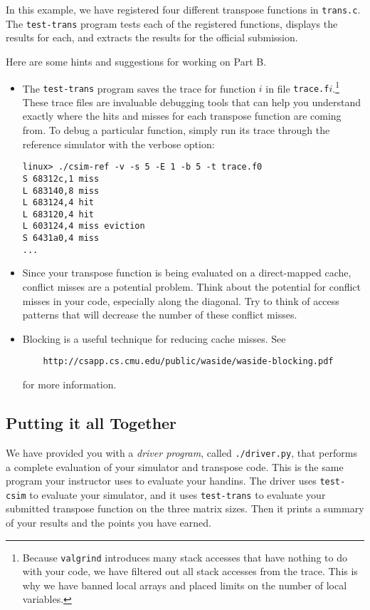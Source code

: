 \documentclass[11pt]{article}
\begin{document}
In this example, we have registered four different transpose
functions in {\tt trans.c}. The \verb:test-trans: program tests each
of the registered functions, displays the results for each, and
extracts the results for the official submission.

Here are some hints and suggestions for working on Part B.
\begin{itemize}
\item The {\tt test-trans} program saves the trace for function $i$ in
  file {\tt trace.f}$i$.\footnote{Because {\tt valgrind} introduces
    many stack accesses that have nothing to do with your code, we
    have filtered out all stack accesses from the trace. This is why
    we have banned local arrays and placed limits on the number of
    local variables.} These trace files are invaluable debugging tools
  that can help you understand exactly where the hits and misses for
  each transpose function are coming from. To debug a particular
  function, simply run its trace through the reference simulator with
  the verbose option:
\begin{verbatim}
linux> ./csim-ref -v -s 5 -E 1 -b 5 -t trace.f0
S 68312c,1 miss
L 683140,8 miss
L 683124,4 hit
L 683120,4 hit
L 603124,4 miss eviction
S 6431a0,4 miss
...
\end{verbatim}

\item Since your transpose function is being evaluated on a
  direct-mapped cache, conflict misses are a potential problem.  Think
  about the potential for conflict misses in your code, especially
  along the diagonal. Try to think of access patterns that will
  decrease the number of these conflict misses.

\item Blocking is a useful technique for reducing cache misses. See
\begin{verbatim}
    http://csapp.cs.cmu.edu/public/waside/waside-blocking.pdf
\end{verbatim}
for more information.

\end{itemize}

\subsection{Putting it all Together}

We have provided you with a {\em driver program}, called
\verb+./driver.py+, that performs a complete evaluation of your
simulator and transpose code. This is the same program your instructor
uses to evaluate your handins. The driver uses {\tt test-csim}
to evaluate your simulator, and it uses {\tt test-trans} to evaluate
your submitted transpose function on the three matrix sizes. Then it
prints a summary of your results and the points you have earned.
\end{document}
